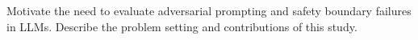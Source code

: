 Motivate the need to evaluate adversarial prompting and safety boundary failures in LLMs. Describe the problem setting and contributions of this study.

